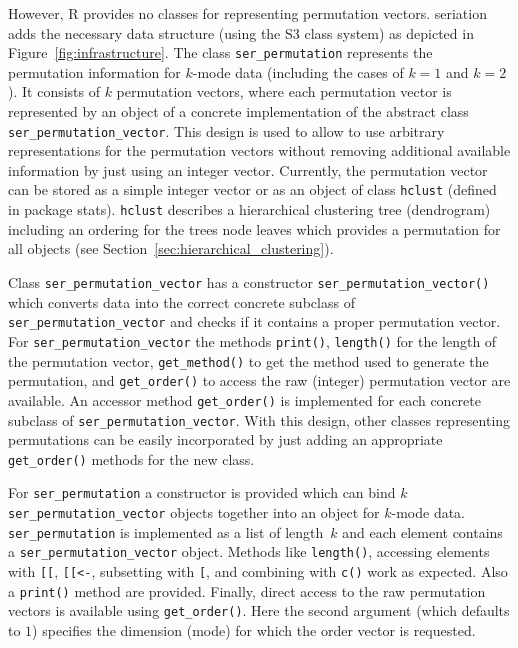 \documentclass[fleqn, a4paper]{article}
\newcommand{\strong}[1]{{\normalfont\fontseries{b}\selectfont #1}}
\newcommand{\func}[1]{\mbox{\texttt{#1()}}}
\newcommand{\code}[1]{\mbox{\texttt{#1}}}
\newcommand{\pkg}[1]{\strong{#1}}
\begin{document}
However, R provides no classes for representing permutation vectors.
\pkg{seriation} adds the necessary data structure (using the S3 class
system) as depicted in Figure~\ref{fig:infrastructure}. The class
\code{ser\_permutation} represents the permutation information for
$k$-mode data (including the cases of $k=1$ and $k=2$). It consists of
$k$ permutation vectors, where each permutation vector is represented by
an object of a concrete implementation of the abstract class
\code{ser\_permutation\_vector}.  This design is used to allow to use
arbitrary representations for the permutation vectors without removing
additional available information by just using an integer
vector. Currently, the permutation vector can be stored as a simple
integer vector or as an object of class \code{hclust} (defined in
package \pkg{stats}). \code{hclust} describes a hierarchical clustering
tree (dendrogram) including an ordering for the trees node leaves which
provides a permutation for all objects (see
Section~\ref{sec:hierarchical_clustering}).

Class \code{ser\_permutation\_vector} has a constructor
\func{ser\_permutation\_vector} which converts data into the correct concrete
subclass of \code{ser\_permutation\_vector} and checks if it contains a proper
permutation vector.  For \code{ser\_permutation\_vector} the methods
\func{print}, \func{length} for the length of the permutation vector,
\func{get\_method} to get the method used to generate the permutation, and
\func{get\_order} to access the raw (integer) permutation vector are available.
An accessor method \func{get\_order} is implemented for each concrete subclass
of \code{ser\_permutation\_vector}.  With this design, other classes
representing permutations can be easily incorporated by just adding an
appropriate \func{get\_order} methods for the new class.

For \code{ser\_permutation} a constructor is provided which can bind $k$
\code{ser\_permutation\_vector} objects together into an object for $k$-mode
data. \code{ser\_permutation} is implemented as a list of length~$k$ and each
element contains a \code{ser\_permutation\_vector} object.  Methods like
\func{length}, accessing elements with \code{[[}, \code{[[<-}, subsetting
with \code{[}, and combining  with \func{c} work as expected.  Also a
\func{print} method are provided. Finally, direct access to the raw permutation
vectors is available using \func{get\_order}.  Here the second argument (which
defaults to $1$) specifies the dimension (mode) for which the order vector is
requested.
\end{document}
